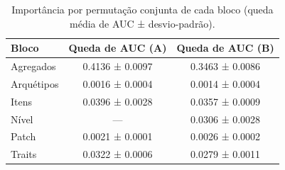 \begin{table}[htbp]
\caption{Importância por permutação conjunta de cada bloco (queda média de AUC ± desvio-padrão).}
\label{tab:permutacao}
\centering
\small
\begin{tabular}{lcc}
\toprule
Bloco & Queda de AUC (A) & Queda de AUC (B) \\
\midrule
Agregados & 0.4136 ± 0.0097 & 0.3463 ± 0.0086 \\
Arquétipos & 0.0016 ± 0.0004 & 0.0014 ± 0.0004 \\
Itens & 0.0396 ± 0.0028 & 0.0357 ± 0.0009 \\
Nível & — & 0.0306 ± 0.0028 \\
Patch & 0.0021 ± 0.0001 & 0.0026 ± 0.0002 \\
Traits & 0.0322 ± 0.0006 & 0.0279 ± 0.0011 \\
\bottomrule
\end{tabular}
\end{table}
